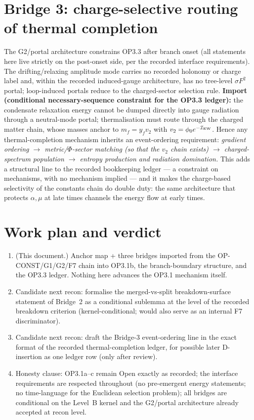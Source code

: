 \documentclass[11pt,a4paper]{article}
\begin{document}
\section{Bridge 3: charge-selective routing of thermal completion}
The G2/portal architecture constrains OP3.3 after branch onset (all
statements here live strictly on the post-onset side, per the recorded
interface requirements). The drifting/relaxing amplitude mode carries no
recorded holonomy or charge label and, within the recorded induced-gauge
architecture, has no tree-level $\sigma F^2$ portal; loop-induced portals
reduce to the charged-sector selection rule. \textbf{Import (conditional
necessary-sequence constraint for the OP3.3 ledger):} the condensate
relaxation energy cannot be dumped directly into gauge radiation through a
neutral-mode portal; thermalisation must route through the charged matter
chain, whose masses anchor to $m_f=y_fv_2$ with
$v_2=\phi_0e^{-\mathcal I_{\rm EW}}$. Hence any thermal-completion
mechanism inherits an event-ordering requirement:
\emph{gradient ordering $\to$ metric/$\Phi$-sector matching (so that the
$v_2$ chain exists) $\to$ charged-spectrum population $\to$ entropy
production and radiation domination.}
This adds a structural line to the recorded bookkeeping ledger --- a
constraint on mechanisms, with no mechanism implied --- and it makes the
charge-based selectivity of the constants chain do double duty: the same
architecture that protects $\alpha,\mu$ at late times channels the energy
flow at early times.

\section{Work plan and verdict}
\begin{enumerate}[leftmargin=1.9em,itemsep=2pt,label=\textbf{B\arabic*.}]
\item (This document.) Anchor map + three bridges imported from the
OP-CONST/G1/G2/F7 chain into OP3.1b, the branch-boundary structure, and the
OP3.3 ledger. Nothing here advances the OP3.1 mechanism itself.
\item Candidate next recon: formalise the merged-vs-split breakdown-surface
statement of Bridge~2 as a conditional sublemma at the level of the
recorded breakdown criterion (kernel-conditional; would also serve as an
internal F7 discriminator).
\item Candidate next recon: draft the Bridge-3 event-ordering line in the
exact format of the recorded thermal-completion ledger, for possible later
D-insertion as one ledger row (only after review).
\item Honesty clause: OP3.1a--c remain Open exactly as recorded; the
interface requirements are respected throughout (no pre-emergent energy
statements; no time-language for the Euclidean selection problem); all
bridges are conditional on the Level~B kernel and the G2/portal
architecture already accepted at recon level.
\end{enumerate}
\end{document}
